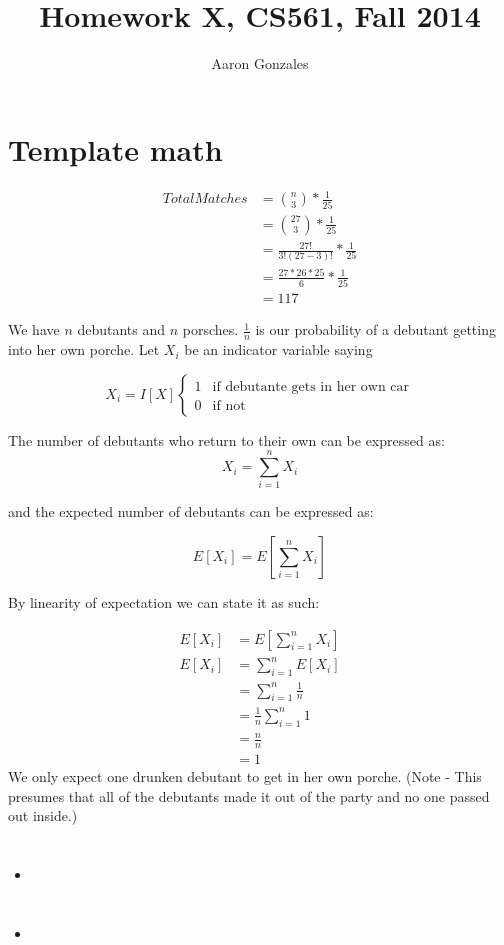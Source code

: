 \documentclass[titlepage]{article}\usepackage[]{graphicx}\usepackage[]{color}
\begin{document}
\title{Homework X, CS561, Fall 2014}
\author{Aaron Gonzales}
\maketitle


\section{Template math}
\begin{align*}
	Total Matches &={n \choose 3} * \frac{1}{25} \\
					&= {27 \choose 3}   * \frac{1}{25} \\
					&=   \frac{27!}{3!(27-3)!} * \frac{1}{25} \\
					&= \frac{27 * 26 * 25}{6} * \frac{1}{25}  \\
					&= 117
\end{align*}


We have $n$ debutants and $n$ porsches. 
$\frac{1}{n}$ is our probability of a debutant getting into her own porche.
Let $X_i$ be an indicator variable saying 

\[
	X_i = I[X]
	\begin{cases}
		1 & \text{if debutante gets in her own car} \\
		0 & \text{if not} 
	\end{cases}
\]

The number of debutants who return to their own can be expressed as:
\[ X_i = \sum_{i=1}^n X_i \]

and the expected number of debutants can be expressed as:

\[ E [X_i] = E \left[ \sum_{i=1}^n X_i \right] \]

By linearity of expectation we can state it as such:

\begin{align*}
	E [X_i] &= E \left[ \sum_{i=1}^n X_i \right] \\
	E [X_i] &=  \sum_{i=1}^n E[X_i] \\ 
	&=  \sum_{i=1}^n \frac{1}{n} \\ 
	&=  \frac{1}{n} \sum_{i=1}^n 1 \\
	&= \frac{n}{n} \\
	& = 1
\end{align*}
We only expect one drunken debutant to get in her own porche. (Note - This presumes
that all of the debutants made it out of the party and no one passed out
inside.)


\section{}
\begin{quote}
  \textbf{}
\end{quote}

\begin{itemize}
  \item \textbf{}
  \item \textbf{ }
\end{itemize}











  
\end{document}
